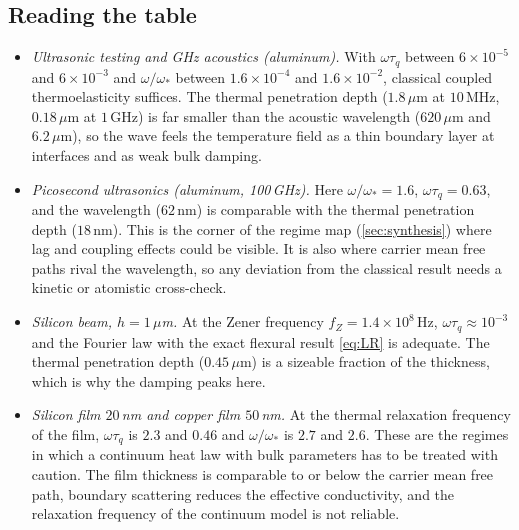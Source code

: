 \subsection{Reading the table}
\begin{itemize}
\item \emph{Ultrasonic testing and GHz acoustics (aluminum).} With $\omega\tau_q$ between $6\times10^{-5}$ and $6\times10^{-3}$ and $\omega/\omega_*$ between $1.6\times10^{-4}$ and $1.6\times10^{-2}$, classical coupled thermoelasticity suffices. The thermal penetration depth ($1.8\,\mu$m at $10$\,MHz, $0.18\,\mu$m at $1$\,GHz) is far smaller than the acoustic wavelength ($620\,\mu$m and $6.2\,\mu$m), so the wave feels the temperature field as a thin boundary layer at interfaces and as weak bulk damping.
\item \emph{Picosecond ultrasonics (aluminum, 100\,GHz).} Here $\omega/\omega_*=1.6$, $\omega\tau_q=0.63$, and the wavelength ($62$\,nm) is comparable with the thermal penetration depth ($18$\,nm). This is the corner of the regime map (\cref{sec:synthesis}) where lag and coupling effects could be visible. It is also where carrier mean free paths rival the wavelength, so any deviation from the classical result needs a kinetic or atomistic cross-check.
\item \emph{Silicon beam, $h=1\,\mu$m.} At the Zener frequency $f_Z=1.4\times10^{8}$\,Hz, $\omega\tau_q\approx10^{-3}$ and the Fourier law with the exact flexural result \cref{eq:LR} is adequate. The thermal penetration depth ($0.45\,\mu$m) is a sizeable fraction of the thickness, which is why the damping peaks here.
\item \emph{Silicon film $20$\,nm and copper film $50$\,nm.} At the thermal relaxation frequency of the film, $\omega\tau_q$ is $2.3$ and $0.46$ and $\omega/\omega_*$ is $2.7$ and $2.6$. These are the regimes in which a continuum heat law with bulk parameters has to be treated with caution. The film thickness is comparable to or below the carrier mean free path, boundary scattering reduces the effective conductivity, and the relaxation frequency of the continuum model is not reliable.
\end{itemize}

